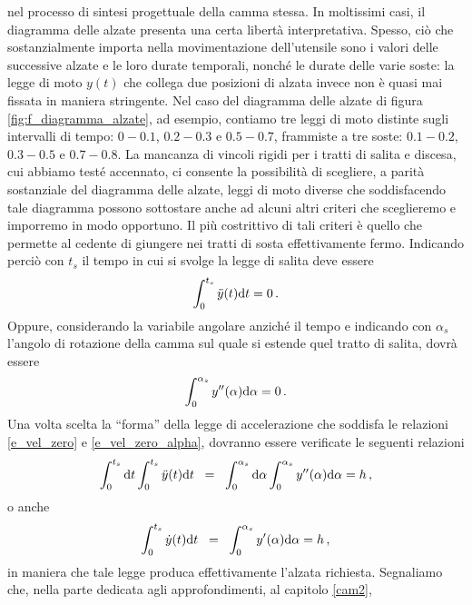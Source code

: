 nel processo di sintesi progettuale della camma stessa.
In moltissimi casi, il diagramma delle alzate presenta una certa libert\`a interpretativa.
Spesso, ci\`o che sostanzialmente importa nella movimentazione dell'utensile
sono i valori delle successive alzate e le loro durate temporali, nonch\'e le
durate delle varie soste:
la legge di moto $y(t)$ che collega 
due posizioni di alzata invece non \`e quasi mai fissata in maniera stringente.
Nel caso del diagramma delle alzate di figura \ref{fig:f_diagramma_alzate}, ad esempio,
contiamo tre leggi di moto distinte sugli intervalli di tempo:
$0-0.1$, $0.2-0.3$ e $0.5-0.7$, frammiste a tre 
soste: $0.1-0.2$, $0.3-0.5$ e $0.7-0.8$. 
La mancanza di vincoli rigidi per i tratti di salita e discesa, cui abbiamo test\'e accennato, ci consente  la possibilit\`a di scegliere, a parit\`a
 sostanziale del
diagramma delle alzate, leggi di moto diverse che soddisfacendo tale diagramma 
possono sottostare anche ad alcuni altri criteri che sceglieremo e imporremo in
modo opportuno. Il pi\`u costrittivo di tali criteri \`e quello che permette
al cedente di giungere nei tratti di sosta effettivamente fermo. Indicando 
perci\`o con $t_s$ il tempo in cui si svolge la legge di salita deve 
essere
\begin{equation}
\int_0^{t_s} \ddot y(t) {\rm d}t=0\,.
\label{e_vel_zero}
\end{equation}
\noindent Oppure, considerando la variabile angolare anzich\'e il tempo e
indicando con $\alpha_s$ l'angolo di rotazione della camma
sul quale si estende quel tratto di salita, dovr\`a essere
\begin{equation}
\int_0^{\alpha_s}  y''(\alpha) {\rm d}\alpha=0\,.
\label{e_vel_zero_alpha}
\end{equation}
\noindent Una volta scelta la ``forma'' della
legge di accelerazione che soddisfa le relazioni \ref{e_vel_zero} e
\ref{e_vel_zero_alpha}, dovranno essere verificate le seguenti relazioni
\begin{equation}
\int_0^{t_s} {\rm d}t\int_0^{t_s} \ddot y(t) {\rm d}t\;\;=\;\;
\int_0^{\alpha_s} {\rm d}\alpha\int_0^{\alpha_s} y''(\alpha) {\rm d}\alpha=h\,,
\label{eq:ha}
\end{equation}
\noindent o anche
\begin{equation}
\int_0^{t_s} \dot y(t) {\rm d}t\;\;=\;\;
\int_0^{\alpha_s} y'(\alpha) {\rm d}\alpha=h\,,
\label{eq:hv}
\end{equation}
\noindent in maniera che tale legge produca effettivamente l'alzata richiesta.
Segnaliamo che,
nella parte dedicata agli approfondimenti, al capitolo \ref{cam2},
